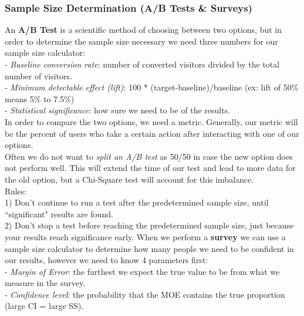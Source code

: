 \documentclass[11pt, a4paper]{article}
\begin{document}
\begin{spacing}{1.1}
	\subsubsection{Sample Size Determination (A/B Tests \& Surveys)}
	An \textbf{A/B Test} is a scientific method of choosing between two options, but in order to determine the sample size necessary we need three numbers for our sample size calculator: \\
	\hspace*{3mm} - \textit{Baseline conversion rate}: number of converted visitors divided by the total number of visitors. \\
	\hspace*{3mm} - \textit{Minimum detectable effect (lift)}: 100 * (target-baseline)/baseline (ex: lift of 50\% means 5\% to 7.5\%)\\
	\hspace*{3mm} - \textit{Statistical significance}: how sure we need to be of the results. \\
	In order to compare the two options, we need a metric. Generally, our metric will be the percent of users who take a certain action after interacting with one of our options. \vspace*{1mm} \\
	Often we do not want to \textit{split an A/B test} as 50/50 in case the new option does not perform well. This will extend the time of our test and lead to more data for the old option, but a Chi-Square test will account for this imbalance. \vspace*{1mm} \\
	Rules: \\
	1) Don’t continue to run a test after the predetermined sample size, until ``significant" results are found. \\
	2) Don’t stop a test before reaching the predetermined sample size, just because your results reach \hspace*{4mm} significance early. \newpage
	\noindent When we perform a \textbf{survey} we can use a sample size calculator to determine how many people we need to be confident in our results, however we need to know 4 parameters first: \\
	\hspace*{3mm} - \textit{Margin of Error}: the furthest we expect the true value to be from what we measure in the survey. \\
	\hspace*{3mm} - \textit{Confidence level}: the probability that the MOE contains the true proportion (large CI = large SS). \\

\end{spacing}
\end{document}
